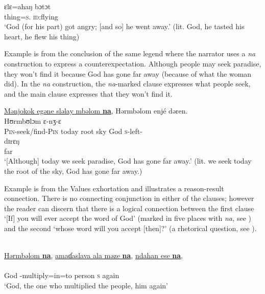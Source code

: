       \medskip
\gll ɛlɛ=ahaŋ bɔtɔt\\      
     thing=\textsc{s}.{\POSS}  \textsc{id}:flying\\ 
\glt  ‘God (for his part) got angry; [and so] he went away.’ (lit. God, he tasted his heart, he flew his thing)
\z

Example  is from the conclusion of the same legend where the narrator uses a \textit{na} construction to express a counterexpectation. Although people may seek paradise, they won’t find it because God has gone far away (because of what the woman did). In the \textit{na} construction, the \textit{na}{}-marked clause expresses what people seek, and the main clause expresses that they won’t find it.

\clearpage
\ea \label{ex:11:18}
\underline{Mənjokok  egəne  sləlay  mbəlom  \textbf{na}},  Hərmbəlom  enjé  dəren.\\
\gll  {}            Hʊrmbʊlɔm ɛ-nʒ-ɛ\\ 
      \textsc{Pin}{}-seek/find-\textsc{Pin}  today  root  sky    {\PSP}  God  \textsc{s}-left-{\CL}\\  
      
      \medskip
\gll dɪrɛŋ\\      
     far\\ 
\glt  ‘[Although] today we seek paradise, God has gone far away.’ (lit. we seek today the root of the sky, God has gone far away.)
\z

Example  is from the Values exhortation and illustrates a reason-result connection. There is no connecting conjunction in either of the clauses; however the reader can discern that there is a logical connection between the first clause ‘[If] you will ever accept the word of God' (marked in five places with \textit{na,} see ) and the second ‘whose word will you accept [then]?' (a rhetorical question, see ).


\ea \label{ex:11:19}\\
\underline{Hərmbəlom  \textbf{na}},  \underline{amaɗaslava  ala  məze  \textbf{na}},  \underline{ndahan  ese  \textbf{na}},\\    
\gll  {}             \\ 
      God  {\PSP} {\DEP}-multiply=in=to   person {\PSP} \textsc{s}     again    {\PSP}\\    
\glt ‘God, the one who multiplied the people, him again’ \\
      

